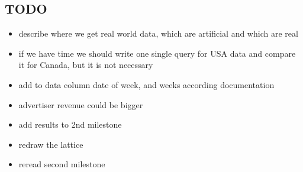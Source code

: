 \subsection{TODO} %
\label{sub:TODO}

\begin{itemize}
    \item describe where we get real world data, which are artificial and which are real
    \item if we have time we should write one single query for USA data and compare it for Canada,
            but it is not necessary
    \item add to data column date of week, and weeks according documentation
    \item advertiser revenue could be bigger
    \item add results to 2nd milestone
    \item redraw the lattice
    \item reread second milestone
\end{itemize}

